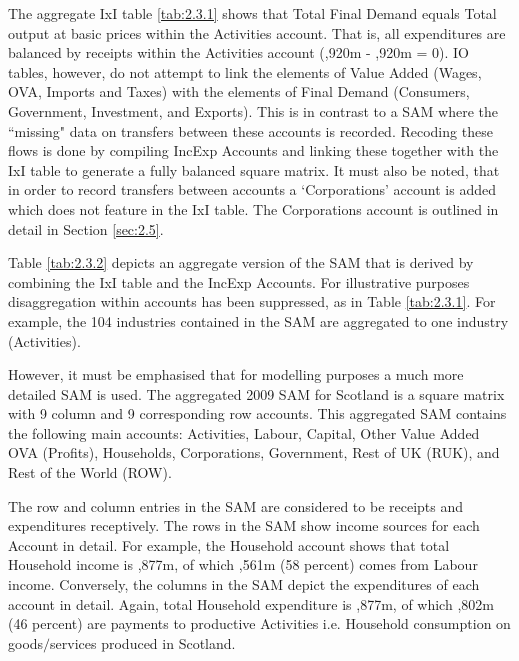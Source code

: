 The aggregate IxI table \ref{tab:2.3.1} shows that Total Final Demand equals Total output at basic prices within the Activities account. That is, all expenditures are balanced by receipts within the Activities account (,920m - ,920m = 0). IO tables, however, do not attempt to link the elements of Value Added (Wages, OVA, Imports and Taxes) with the elements of Final Demand (Consumers, Government, Investment, and Exports). This is in contrast to a SAM where the ``missing" data on transfers between these accounts is recorded. Recoding these flows is done by compiling IncExp Accounts and linking these together with the IxI table to generate a fully balanced square matrix. It must also be noted, that in order to record transfers between accounts a `Corporations' account is added which does not feature in the IxI table. The Corporations account is outlined in detail in Section \ref{sec:2.5}.

\bigskip

Table \ref{tab:2.3.2} depicts an aggregate version of the SAM that is derived by combining the IxI table and the IncExp Accounts. For illustrative purposes disaggregation within accounts has been suppressed, as in Table \ref{tab:2.3.1}. For example, the 104 industries contained in the SAM are aggregated to one industry (Activities).

\bigskip

However, it must be emphasised that for modelling purposes a much more detailed SAM is used. The aggregated 2009 SAM for Scotland is a square matrix with 9 column and 9 corresponding row accounts. This aggregated SAM contains the following main accounts: Activities, Labour, Capital, Other Value Added OVA (Profits), Households, Corporations, Government, Rest of UK (RUK), and Rest of the World (ROW).

\bigskip

The row and column entries in the SAM are considered to be receipts and expenditures receptively. The rows in the SAM show income sources for each Account in detail. For example, the Household account shows that total Household income is ,877m, of which ,561m (58 percent) comes from Labour income. Conversely, the columns in the SAM depict the expenditures of each account in detail. Again, total Household expenditure is ,877m, of which ,802m (46 percent) are payments to productive Activities i.e. Household consumption on goods$/$services produced in Scotland.


